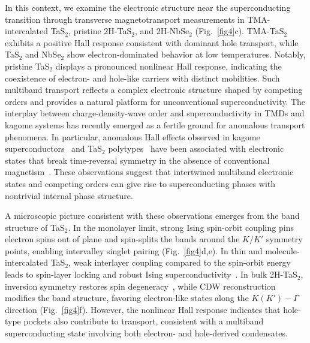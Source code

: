 \documentclass[twocolumn,secnumarabic,amssymb, nobibnotes, aps, prl, superscriptaddress]{revtex4-2}
\begin{document}
In this context, we examine the electronic structure near the superconducting transition through transverse magnetotransport measurements in TMA-intercalated TaS$_2$, pristine 2H-TaS$_2$, and 2H-NbSe$_2$ (Fig.~\ref{fig4}c). TMA-TaS$_2$ exhibits a positive Hall response consistent with dominant hole transport, while TaS$_2$ and NbSe$_2$ show electron-dominated behavior at low temperatures. Notably, pristine TaS$_2$ displays a pronounced nonlinear Hall response, indicating the coexistence of electron- and hole-like carriers with distinct mobilities. Such multiband transport reflects a complex electronic structure shaped by competing orders and provides a natural platform for unconventional superconductivity.
The interplay between charge-density-wave order and superconductivity in TMDs and kagome systems has recently emerged as a fertile ground for anomalous transport phenomena. In particular, anomalous Hall effects observed in kagome superconductors~\cite{Yang2020} and TaS$_2$
 polytypes~\cite{Liu2024} have been associated with electronic states that break time-reversal symmetry in the absence of conventional magnetism~\cite{Mielke2022,chiral4Hb,sil24}. These observations suggest that intertwined multiband electronic states and competing orders can give rise to superconducting phases with nontrivial internal phase structure.

A microscopic picture consistent with these observations emerges from the band structure of TaS$_2$. In the monolayer limit, strong Ising spin-orbit coupling pins electron spins out of plane 
and spin-splits the bands around the $K/K'$  symmetry points, enabling intervalley singlet pairing (Fig.~\ref{fig4}d,e). In thin and molecule-intercalated TaS$_2$, weak interlayer coupling compared to the spin-orbit energy leads to spin-layer locking and robust Ising superconductivity~\cite{bar18,Mar2025}. In bulk 2H-TaS$_2$, inversion symmetry restores spin degeneracy~\cite{yang_enhanced_2018,xi16}, while CDW reconstruction modifies the band structure, favoring electron-like states along the $K(K')-\Gamma$ direction (Fig.~\ref{fig4}f). However, the nonlinear Hall response indicates that hole-type pockets also contribute to transport, consistent with a multiband superconducting state involving both electron- and hole-derived condensates.
\end{document}
